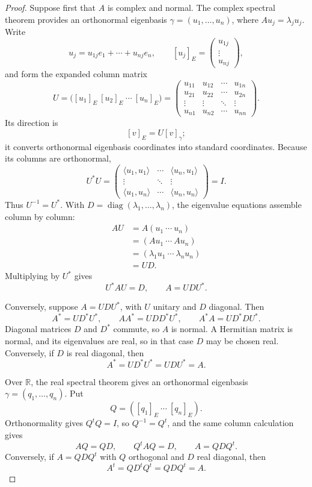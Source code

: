\begin{proof}
Suppose first that \(A\) is complex and normal.  The complex spectral theorem
provides an orthonormal eigenbasis
\(\gamma=(u_1,\ldots,u_n)\), where \(Au_j=\lambda_ju_j\).  Write
\[
u_j=u_{1j}e_1+\cdots+u_{nj}e_n,
\qquad
[u_j]_E=\begin{pmatrix}u_{1j}\\ \vdots\\ u_{nj}\end{pmatrix},
\]
and form the expanded column matrix
\[
U=\bigl([u_1]_E\ [u_2]_E\ \cdots\ [u_n]_E\bigr)
=\begin{pmatrix}
u_{11}&u_{12}&\cdots&u_{1n}\\
u_{21}&u_{22}&\cdots&u_{2n}\\
\vdots&\vdots&\ddots&\vdots\\
u_{n1}&u_{n2}&\cdots&u_{nn}
\end{pmatrix}.
\]
Its direction is
\[
[v]_E=U[v]_\gamma;
\]
it converts orthonormal eigenbasis coordinates into standard coordinates.
Because its columns are orthonormal,
\[
U^*U=
\begin{pmatrix}
\langle u_1,u_1\rangle&\cdots&\langle u_n,u_1\rangle\\
\vdots&\ddots&\vdots\\
\langle u_1,u_n\rangle&\cdots&\langle u_n,u_n\rangle
\end{pmatrix}
=I.
\]
Thus \(U^{-1}=U^*\).  With \(D=\operatorname{diag}(\lambda_1,\ldots,\lambda_n)\),
the eigenvalue equations assemble column by column:
\[
\begin{aligned}
AU
&=A(u_1\ \cdots\ u_n)\\
&=(Au_1\ \cdots\ Au_n)\\
&=(\lambda_1u_1\ \cdots\ \lambda_nu_n)\\
&=UD.
\end{aligned}
\]
Multiplying by \(U^*\) gives
\[
U^*AU=D,\qquad A=UDU^*.
\]

Conversely, suppose \(A=UDU^*\), with \(U\) unitary and \(D\) diagonal.
Then
\[
A^*=UD^*U^*,
\qquad
AA^*=UDD^*U^*,
\qquad
A^*A=UD^*DU^*.
\]
Diagonal matrices \(D\) and \(D^*\) commute, so \(A\) is normal.  A Hermitian
matrix is normal, and its eigenvalues are real, so in that case \(D\) may be
chosen real.  Conversely, if \(D\) is real diagonal, then
\[
A^*=UD^*U^*=UDU^*=A.
\]

Over \(\mathbb R\), the real spectral theorem gives an orthonormal eigenbasis
\(\gamma=(q_1,\ldots,q_n)\).  Put
\[
Q=([q_1]_E\ \cdots\ [q_n]_E).
\]
Orthonormality gives \(Q^tQ=I\), so \(Q^{-1}=Q^t\), and the same column
calculation gives
\[
AQ=QD,\qquad Q^tAQ=D,\qquad A=QDQ^t.
\]
Conversely, if \(A=QDQ^t\) with \(Q\) orthogonal and \(D\) real diagonal,
then
\[
A^t=QD^tQ^t=QDQ^t=A.
\]
\end{proof}

